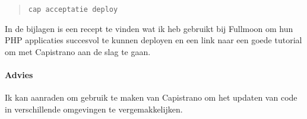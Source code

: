 \begin{quote}
  \texttt{cap acceptatie deploy}
\end{quote}

In de bijlagen is een recept te vinden wat ik heb gebruikt bij Fullmoon om hun PHP applicaties succesvol te kunnen deployen en een link naar een goede tutorial om met Capistrano aan de slag te gaan.

\paragraph{Advies} Ik kan aanraden om gebruik te maken van Capistrano om het updaten van code in verschillende omgevingen te vergemakkelijken.

